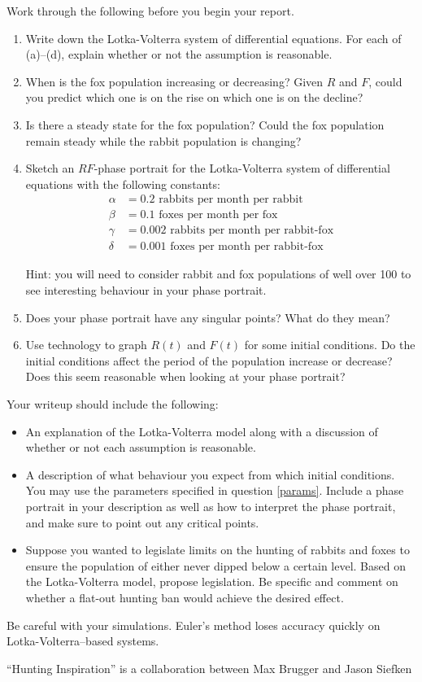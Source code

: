 	Work through the following before you begin your report.

	\begin{enumerate}[label=\emph{\arabic*.}]
		\item Write down the Lotka-Volterra system of differential equations.  For
			each of (a)--(d), explain whether or not the assumption is reasonable.
		\item When is the fox population increasing or decreasing?  Given $R$ and $F$,
			could you predict which one is on the rise on which one is on the decline?
		\item Is there a steady state for the fox population?  Could the fox population
			remain steady while the rabbit population is changing?
		\item \label{params}
			Sketch an $RF$-phase portrait for the Lotka-Volterra system of differential
			equations with the following constants:
			\begin{align*}
				\alpha &= 0.2\text{ rabbits per month per rabbit}\\
				\beta &= 0.1\text{ foxes per month per fox}\\
				\gamma &= 0.002\text{ rabbits per month per rabbit-fox}\\
				\delta &= 0.001\text{ foxes per month per rabbit-fox}
			\end{align*}

			Hint: you will need to consider rabbit and fox populations of well over
			100 to see interesting behaviour in your phase portrait.
		\item Does your phase portrait have any singular points?  What do they mean?
		\item Use technology to graph $R(t)$ and $F(t)$ for some initial conditions.  
			Do the initial conditions affect the period of the population increase
			or decrease?  Does this seem reasonable when looking at your phase portrait?
	\end{enumerate}


	Your writeup should include the following:
	\begin{itemize}
		\item An explanation of the Lotka-Volterra model along with a discussion of
			whether or not each assumption is reasonable.
		\item A description of what behaviour you expect from which initial conditions.  You may use
			the parameters specified in question \ref{params}.  Include a phase portrait in
			your description as well as how to interpret the phase portrait, and make sure to point
			out any critical points.
		\item Suppose you wanted to legislate limits on the hunting of rabbits and foxes to ensure the population of either
			never dipped below a certain level.  Based on the Lotka-Volterra model, propose
			legislation.  Be specific and comment on whether a flat-out hunting ban
			would achieve the desired effect.
	\end{itemize}


	Be careful with your simulations.  Euler's method loses accuracy quickly on Lotka-Volterra--based systems.




\vfill

\hfill ``Hunting Inspiration'' is a collaboration between Max Brugger and Jason Siefken




\begin{noexercises}
\end{noexercises}
